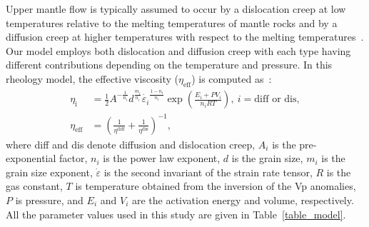\documentclass[draft,linenumbers]{agujournal2018}
\begin{document}
Upper mantle flow is typically assumed to occur by a dislocation creep at low temperatures relative to the melting temperatures of mantle rocks and by a diffusion creep at higher temperatures with respect to the melting temperatures~\citep[e.g.,][]{gordon1967thermally}. Our model employs both dislocation and diffusion creep with each type having different contributions depending on the temperature and pressure. In this rheology model, the effective viscosity ($\eta_{\text{eff}}$) is computed as~\citep{billen2007rheologic}:
%
\begin{align}
    \eta_{\text{i}} &= \frac{1}{2} A^{-\frac{1}{n_i}} d^\frac{m_i}{n_i} \dot{\varepsilon_i}^{\frac{1-n_i}{n_i}} \exp\left(\frac{E_i + PV_i}{n_iRT}\right),\ i=\text{diff or dis}, \\
    \eta_{\text{eff}} &= \left(\frac{1}{\eta^\text{diff}} + \frac{1}{\eta^\text{dis}}\right)^{-1},
\end{align}
%
where diff and dis denote diffusion and dislocation creep, $A_i$ is the pre-exponential factor, $n_i$ is the power law exponent, $d$ is the grain size, $m_i$ is the grain size exponent, $\dot{\varepsilon}$ is the second invariant of the strain rate tensor, $R$ is the gas constant, $T$ is temperature obtained from the inversion of the Vp anomalies, $P$ is pressure, and $E_i$ and $V_i$ are the activation energy and volume, respectively. All the parameter values used in this study are given in Table~\ref{table_model}.
\end{document}
